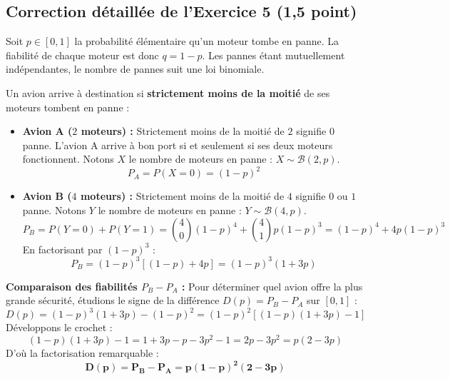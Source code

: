 \documentclass[11pt,a4paper]{article}
\begin{document}
\vspace{0.4cm}

\subsection*{Correction détaillée de l'Exercice 5 \hfill (1,5 point)}

\begin{correctionbox}
Soit $p \in [0, 1]$ la probabilité élémentaire qu'un moteur tombe en panne. La fiabilité de chaque moteur est donc $q = 1-p$.
Les pannes étant mutuellement indépendantes, le nombre de pannes suit une loi binomiale.

Un avion arrive à destination si \textbf{strictement moins de la moitié} de ses moteurs tombent en panne :
\begin{itemize}[label=$\bullet$]
    \item \textbf{Avion A ($2$ moteurs) :} Strictement moins de la moitié de $2$ signifie $0$ panne.
    L'avion A arrive à bon port si et seulement si ses deux moteurs fonctionnent.
    Notons $X$ le nombre de moteurs en panne : $X \sim \mathcal{B}(2, p)$.
    \[
    P_A = P(X = 0) = (1-p)^2
    \]
    \item \textbf{Avion B ($4$ moteurs) :} Strictement moins de la moitié de $4$ signifie $0$ ou $1$ panne.
    Notons $Y$ le nombre de moteurs en panne : $Y \sim \mathcal{B}(4, p)$.
    \[
    P_B = P(Y = 0) + P(Y = 1) = \binom{4}{0} (1-p)^4 + \binom{4}{1} p(1-p)^3 = (1-p)^4 + 4p(1-p)^3
    \]
    En factorisant par $(1-p)^3$ :
    \[
    P_B = (1-p)^3 \left[(1-p) + 4p\right] = (1-p)^3 (1 + 3p)
    \]
\end{itemize}

\textbf{Comparaison des fiabilités $P_B - P_A$ :}
Pour déterminer quel avion offre la plus grande sécurité, étudions le signe de la différence $D(p) = P_B - P_A$ sur $[0, 1]$ :
\[
D(p) = (1-p)^3 (1+3p) - (1-p)^2 = (1-p)^2 \left[(1-p)(1+3p) - 1\right]
\]
Développons le crochet :
\[
(1-p)(1+3p) - 1 = 1 + 3p - p - 3p^2 - 1 = 2p - 3p^2 = p(2 - 3p)
\]
D'où la factorisation remarquable :
\[
\mathbf{D(p) = P_B - P_A = p (1-p)^2 (2 - 3p)}
\]


\end{correctionbox}
\end{document}
